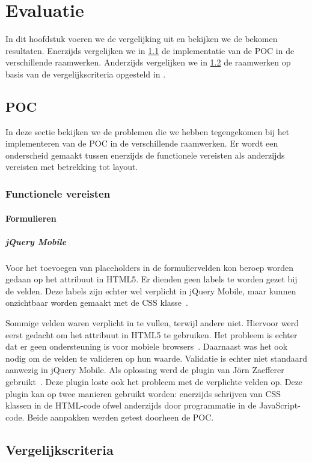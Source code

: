 \chapter{Evaluatie}
\label{chap:evaluatie}

In dit hoofdstuk voeren we de vergelijking uit en bekijken we de bekomen resultaten.
Enerzijds vergelijken we in \ref{sec:evaluatie-poc} de implementatie van de POC in de verschillende raamwerken.
Anderzijds vergelijken we in \ref{sec:evaluatie-criteria} de raamwerken op basis van de vergelijkscriteria opgesteld in .


\section{POC}
\label{sec:evaluatie-poc}
In deze sectie bekijken we de problemen die we hebben tegengekomen bij het implementeren van de POC in de verschillende raamwerken.
Er wordt een onderscheid gemaakt tussen enerzijds de functionele vereisten als anderzijds vereisten met betrekking tot layout.

\subsection{Functionele vereisten}

\subsubsection{Formulieren}

\paragraph{jQuery Mobile} 
Voor het toevoegen van placeholders in de formuliervelden kon beroep worden gedaan op het  attribuut in HTML5. Er dienden geen labels te worden gezet bij de velden. Deze labels zijn echter wel verplicht in jQuery Mobile, maar kunnen onzichtbaar worden gemaakt met de  CSS klasse~\cite{JQuery2013}.

Sommige velden waren verplicht in te vullen, terwijl andere niet. Hiervoor werd eerst gedacht om het  attribuut in HTML5 te gebruiken. Het probleem is echter dat er geen ondersteuning is voor mobiele browsers~\cite{Deveria2013}. Daarnaast was het ook nodig om de velden te valideren op hun waarde. Validatie is echter niet standaard aanwezig in jQuery Mobile. Als oplossing werd de plugin van Jörn Zaefferer gebruikt~\cite{Zaefferer2013}. Deze plugin loste ook het probleem met de verplichte velden op. Deze plugin kan op twee manieren gebruikt worden: enerzijds schrijven van CSS klassen in de HTML-code ofwel anderzijds door programmatie in de JavaScript-code. Beide aanpakken werden getest doorheen de POC. 





\section{Vergelijkscriteria}
\label{sec:evaluatie-criteria}